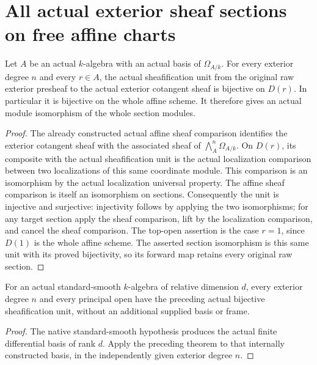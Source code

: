 \section{All actual exterior sheaf sections on free affine charts}

\begin{theorem}\label{sc0-affine-exterior-sections:unit}
\leanok
{}
Let $A$ be an actual $k$-algebra with an actual basis of $\Omega_{A/k}$. For every exterior degree $n$ and every $r\in A$, the actual sheafification unit from the original raw exterior presheaf to the actual exterior cotangent sheaf is bijective on $D(r)$. In particular it is bijective on the whole affine scheme. It therefore gives an actual module isomorphism of the whole section modules.
\end{theorem}
\begin{proof}
The already constructed actual affine sheaf comparison identifies the exterior cotangent sheaf with the associated sheaf of $\bigwedge_A^n\Omega_{A/k}$. On $D(r)$, its composite with the actual sheafification unit is the actual localization comparison between two localizations of this same coordinate module. This comparison is an isomorphism by the actual localization universal property. The affine sheaf comparison is itself an isomorphism on sections. Consequently the unit is injective and surjective: injectivity follows by applying the two isomorphisms; for any target section apply the sheaf comparison, lift by the localization comparison, and cancel the sheaf comparison. The top-open assertion is the case $r=1$, since $D(1)$ is the whole affine scheme. The asserted section isomorphism is this same unit with its proved bijectivity, so its forward map retains every original raw section.
\end{proof}

\begin{theorem}\label{sc0-affine-exterior-sections:standard-smooth}
\leanok
{}
For an actual standard-smooth $k$-algebra of relative dimension $d$, every exterior degree $n$ and every principal open have the preceding actual bijective sheafification unit, without an additional supplied basis or frame.
\end{theorem}
\begin{proof}
The native standard-smooth hypothesis produces the actual finite differential basis of rank $d$. Apply the preceding theorem to that internally constructed basis, in the independently given exterior degree $n$.
\end{proof}
